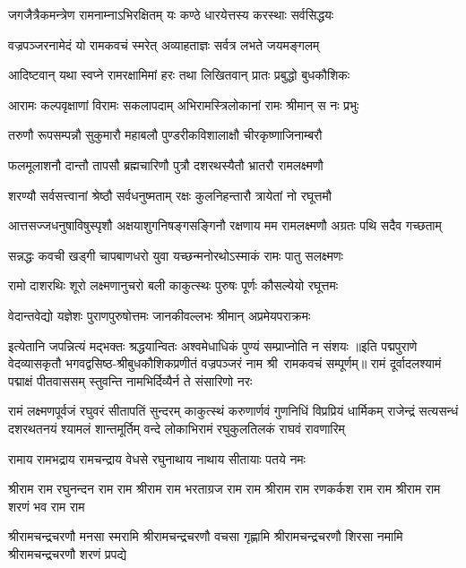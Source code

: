 \twolineshloka
{जगजैत्रैकमन्त्रेण रामनाम्नाऽभिरक्षितम्}
{यः कण्ठे धारयेत्तस्य करस्थाः सर्वसिद्धयः}

\twolineshloka
{वज्रपञ्जरनामेदं यो रामकवचं स्मरेत्}
{अव्याहताज्ञः सर्वत्र लभते जयमङ्गलम्}

\twolineshloka
{आदिष्टवान् यथा स्वप्ने रामरक्षामिमां हरः}
{तथा लिखितवान् प्रातः प्रबुद्धो बुधकौशिकः}

\twolineshloka
{आरामः कल्पवृक्षाणां विरामः सकलापदाम्}
{अभिरामस्त्रिलोकानां रामः श्रीमान् स नः प्रभुः}

\twolineshloka
{तरुणौ रूपसम्पन्नौ सुकुमारौ महाबलौ}
{पुण्डरीकविशालाक्षौ चीरकृष्णाजिनाम्बरौ}

\twolineshloka
{फलमूलाशनौ दान्तौ तापसौ ब्रह्मचारिणौ}
{पुत्रौ दशरथस्यैतौ भ्रातरौ रामलक्ष्मणौ}

\twolineshloka
{शरण्यौ सर्वसत्त्वानां श्रेष्ठौ सर्वधनुष्मताम्}
{रक्षः कुलनिहन्तारौ त्रायेतां नो रघूत्तमौ}

\twolineshloka
{आत्तसज्जधनुषाविषुस्पृशौ अक्षयाशुगनिषङ्गसङ्गिनौ}
{रक्षणाय मम रामलक्ष्मणौ अग्रतः पथि सदैव गच्छताम्}

\twolineshloka
{सन्नद्धः कवची खड्गी चापबाणधरो युवा}
{यच्छन्मनोरथोऽस्माकं रामः पातु सलक्ष्मणः}

\twolineshloka
{रामो दाशरथिः शूरो लक्ष्मणानुचरो बली}
{काकुत्स्थः पुरुषः पूर्णः कौसल्येयो रघूत्तमः}

\twolineshloka
{वेदान्तवेद्यो यज्ञेशः पुराणपुरुषोत्तमः}
{जानकीवल्लभः श्रीमान् अप्रमेयपराक्रमः}

\twolineshloka
{इत्येतानि जपन्नित्यं मद्भक्तः श्रद्धयान्वितः}
{अश्वमेधाधिकं पुण्यं सम्प्राप्नोति न संशयः}
॥इति पद्मपुराणे वेदव्यासकृतौ भगवद्वसिष्ठ-श्रीबुधकौशिकप्रणीतं वज्रपञ्जरं नाम श्री~रामकवचं सम्पूर्णम्॥
\resetShloka
\twolineshloka
{रामं दूर्वादलश्यामं पद्माक्षं पीतवाससम्}
{स्तुवन्ति नामभिर्दिव्यैर्न ते संसारिणो नरः}

\fourlineindentedshloka
{रामं लक्ष्मणपूर्वजं रघुवरं सीतापतिं सुन्दरम्}
{काकुत्स्थं करुणार्णवं गुणनिधिं विप्रप्रियं धार्मिकम्}
{राजेन्द्रं सत्यसन्धं दशरथतनयं श्यामलं शान्तमूर्तिम्}
{वन्दे लोकाभिरामं रघुकुलतिलकं राघवं रावणारिम्}

\twolineshloka
{रामाय रामभद्राय रामचन्द्राय वेधसे}
{रघुनाथाय नाथाय सीतायाः पतये नमः}

\fourlineindentedshloka
{श्रीराम राम रघुनन्दन राम राम}
{श्रीराम राम भरताग्रज राम राम}
{श्रीराम राम रणकर्कश राम राम}
{श्रीराम राम शरणं भव राम राम}

\fourlineindentedshloka
{श्रीरामचन्द्रचरणौ मनसा स्मरामि}
{श्रीरामचन्द्रचरणौ वचसा गृह्णामि}
{श्रीरामचन्द्रचरणौ शिरसा नमामि}
{श्रीरामचन्द्रचरणौ शरणं प्रपद्ये}

